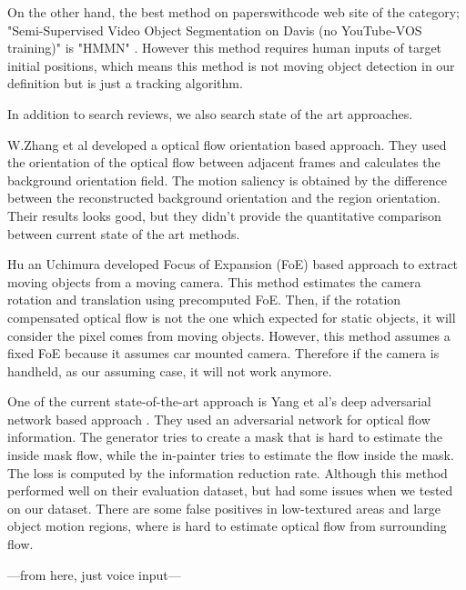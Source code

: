 \documentclass[10pt, twocolumn]{article}
\begin{document}
On the other hand, the best method on paperswithcode web site of the category; "Semi-Supervised Video Object Segmentation on Davis (no YouTube-VOS training)" is "HMMN" \cite{DBLP:journals/corr/abs-2109-11404}.
However this method requires human inputs of target initial positions, which means this method is not moving object detection in our definition but is just a tracking algorithm.

In addition to search reviews, we also search state of the art approaches.

W.Zhang et al \cite{Zhang_Sun_Yu_2020} developed a optical flow orientation based approach.
They used the orientation of the optical flow between adjacent frames and calculates the background orientation field.
The motion saliency is obtained by the difference between the reconstructed background orientation and the region orientation.
Their results looks good, but they didn't provide the quantitative comparison between current state of the art methods.

Hu an Uchimura \cite{hu2000} developed Focus of Expansion (FoE) based approach to extract moving objects from a moving camera.
This method estimates the camera rotation and translation using precomputed FoE.
Then, if the rotation compensated optical flow is not the one which expected for static objects, it will consider the pixel comes from moving objects.
However, this method assumes a fixed FoE because it assumes car mounted camera.
Therefore if the camera is handheld, as our assuming case, it will not work anymore.

One of the current state-of-the-art approach is Yang et al's deep adversarial network based approach \cite{yang_loquercio_2019}.
They used an adversarial network for optical flow information.
The generator tries to create a mask that is hard to estimate the inside mask flow, while the in-painter tries to estimate the flow inside the mask.
The loss is computed by the information reduction rate.
Although this method performed well on their evaluation dataset, but had some issues when we tested on our dataset.
There are some false positives in low-textured areas and large object motion regions, where is hard to estimate optical flow from surrounding flow.


---from here, just voice input---
\end{document}

